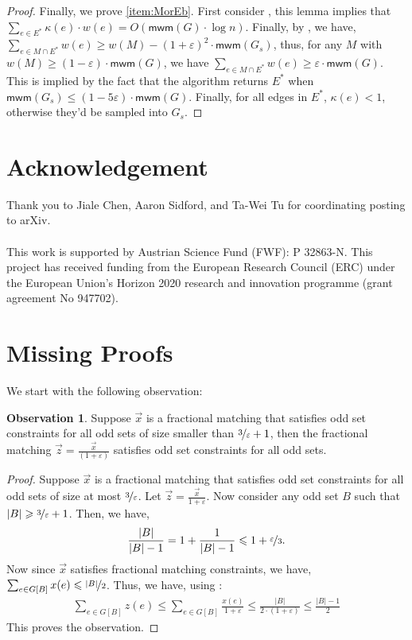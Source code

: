 \documentclass[a4paper,11pt]{article}
\newcommand{\card}[1]{|#1|}
\newcommand{\eps}{\varepsilon}
\theoremstyle{definition}
\theoremstyle{definition}
\theoremstyle{definition}
\theoremstyle{definition}
\theoremstyle{definition}
\theoremstyle{definition}
\theoremstyle{definition}
\newtheorem{observation2}[definition2]{Observation}
\theoremstyle{definition}
\theoremstyle{definition}
\theoremstyle{definition}
\theoremstyle{definition}
\theoremstyle{definition}
\theoremstyle{definition}
\theoremstyle{definition}
\theoremstyle{definition}
\begin{document}
\begin{proof}
Finally, we prove \ref{item:MorEb}. First consider , this lemma implies that $\sum_{e\in E^*}\kappa(e)\cdot w(e)=O(\textsf{mwm}(G)\cdot \log n)$. Finally, by , we have, $\sum_{e\in M\cap E^*} w(e) \geqslant w(M)-(1+\eps)^2\cdot \textsf{mwm}(G_s)$, thus, for any $M$ with $w(M)\geqslant (1-\eps)\cdot \textsf{mwm}(G)$, we have $\sum_{e\in M\cap E^*}w(e)\geqslant \eps\cdot \textsf{mwm}(G)$. This is implied by the fact that the algorithm returns $E^*$ when $\textsf{mwm}(G_s)\leqslant (1-5\eps)\cdot \textsf{mwm}(G)$. Finally, for all edges in $E^*$, $\kappa(e)<1$, otherwise they'd be sampled into $G_s$. 
\end{proof}

\section*{Acknowledgement}
Thank you to Jiale Chen, Aaron Sidford, and Ta-Wei Tu for coordinating posting to arXiv.\\ \\
This work is supported by Austrian
Science Fund (FWF): P 32863-N. This project has received funding from the European Research Council (ERC) under the
European Union’s Horizon 2020 research and innovation programme (grant agreement No 947702).

\appendix

\section{Missing Proofs}

We start with the following observation:
\begin{observation2}\label{obs:smallodd}
Suppose $\vec{x}$ is a fractional matching that satisfies odd set constraints for all odd sets of size smaller than $\nicefrac{3}{\eps}+1$, then the fractional matching $\vec{z}=\frac{\vec{x}}{(1+\eps)}$ satisfies odd set constraints for all odd sets. 
\end{observation2}
\begin{proof}
    Suppose $\vec{x}$ is a fractional matching that satisfies odd set constraints for all odd sets of size at most $\nicefrac{3}{\eps}$. Let $\vec{z}=\frac{\vec{x}}{1+\varepsilon}$. Now consider any odd set $B$ such that $\card{B}\geqslant \nicefrac{3}{\eps}+1$. Then, we have,
    \begin{align}\label{eqn:blossom}
    \frac{\card{B}}{\card{B}-1}=1+\frac{1}{\card{B}-1}\leqslant 1+\nicefrac{\eps}{3}.
    \end{align}
    Now since $\vec{x}$ satisfies fractional matching constraints, we have, $\sum_{e\in G[B]}x(e)\leqslant \nicefrac{\card{B}}{2}$. Thus, we have, using :
    \begin{align*}
        \sum_{e\in G[B]}z(e)\leqslant \sum_{e\in G[B]}\frac{x(e)}{1+\eps}\leqslant \frac{\card{B}}{2\cdot (1+\eps)}\leqslant \frac{\card{B}-1}{2}
    \end{align*}
This proves the observation.
\end{proof}
\end{document}
